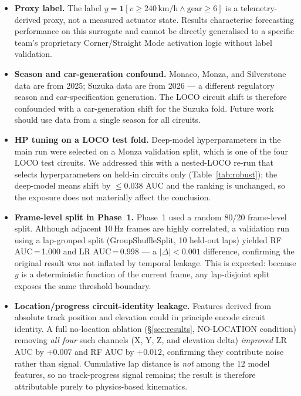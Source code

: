 \documentclass[conference,a4paper]{IEEEtran}
\begin{document}
\begin{itemize}
  \item \textbf{Proxy label.} The label $y = \mathbf{1}[v \geq 240\,\text{km/h}
        \wedge \text{gear} \geq 6]$ is a telemetry-derived proxy, not a measured
        actuator state. Results characterise forecasting performance on this surrogate
        and cannot be directly generalised to a specific team's proprietary
        Corner/Straight Mode activation logic without label validation.

  \item \textbf{Season and car-generation confound.} Monaco, Monza, and Silverstone
        data are from 2025; Suzuka data are from 2026 — a different regulatory season
        and car-specification generation. The LOCO circuit shift is therefore
        confounded with a car-generation shift for the Suzuka fold.
        Future work should use data from a single season for all circuits.

  \item \textbf{HP tuning on a LOCO test fold.} Deep-model hyperparameters in the main run
        were selected on a Monza validation split, which is one of the four LOCO test
        circuits. We addressed this with a nested-LOCO re-run that selects hyperparameters
        on held-in circuits only (Table~\ref{tab:robust}); the deep-model means shift by
        $\leq0.038$ AUC and the ranking is unchanged, so the exposure does not materially
        affect the conclusion.

  \item \textbf{Frame-level split in Phase~1.} Phase~1 used a random 80/20 frame-level
        split. Although adjacent 10\,Hz frames are highly correlated, a validation run
        using a lap-grouped split (GroupShuffleSplit, 10 held-out laps) yielded
        RF AUC\,=\,1.000 and LR AUC\,=\,0.998 — a $|\Delta| < 0.001$ difference,
        confirming the original result was not inflated by temporal leakage.
        This is expected: because $y$ is a deterministic function of the current frame,
        any lap-disjoint split exposes the same threshold boundary.

  \item \textbf{Location/progress circuit-identity leakage.} Features derived from
        absolute track position and elevation could in principle encode circuit identity.
        A full no-location ablation (§\ref{sec:results}, NO-LOCATION condition) removing
        \emph{all four} such channels (X, Y, Z, and elevation delta) \emph{improved}
        LR AUC by $+0.007$ and RF AUC by $+0.012$, confirming they contribute noise rather
        than signal. Cumulative lap distance is \emph{not} among the 12 model features, so no
        track-progress signal remains; the result is therefore attributable purely to
        physics-based kinematics.


\end{itemize}
\end{document}
